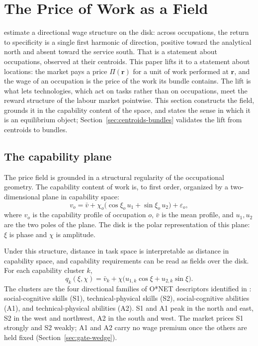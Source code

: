 \documentclass[12pt, a4paper]{article}
\begin{document}
\section{The Price of Work as a Field}
\label{sec:price-field}

\textcite{storck2026geometry} estimate a directional wage structure on
the disk: across occupations, the return to specificity is a single
first harmonic of direction, positive toward the analytical north and
absent toward the service south. That is a statement about
occupations, observed at their centroids. This paper lifts it to a
statement about locations: the market pays a price $\Pi(\mathbf{r})$
for a unit of work performed at $\mathbf{r}$, and the wage of an
occupation is the price of the work its bundle contains. The lift is
what lets technologies, which act on tasks rather than on occupations,
meet the reward structure of the labour market pointwise. This section
constructs the field, grounds it in the capability content of the
space, and states the sense in which it is an equilibrium object;
Section~\ref{sec:centroids-bundles} validates the lift from centroids
to bundles.

\subsection{The capability plane}
\label{sec:capability-plane}

The price field is grounded in a structural regularity of the
occupational geometry. The capability content of work is, to first
order, organized by a two-dimensional plane in capability space:
\begin{equation}
  v_o
  =
  \bar v
  +
  \chi_o
  \bigl(
    \cos\xi_o\,u_1
    +
    \sin\xi_o\,u_2
  \bigr)
  +
  \varepsilon_o,
  \label{eq:capability-plane}
\end{equation}
where $v_o$ is the capability profile of occupation $o$, $\bar v$ is
the mean profile, and $u_1,u_2$ are the two poles of the plane. The disk
is the polar representation of this plane: $\xi$ is phase and $\chi$ is
amplitude.

Under this structure, distance in task space is interpretable as
distance in capability space, and capability requirements can be read as
fields over the disk. For each capability cluster $k$,
\begin{equation}
  q_k(\xi,\chi)
  =
  \bar v_k
  +
  \chi
  \bigl(
    u_{1,k}\cos\xi
    +
    u_{2,k}\sin\xi
  \bigr).
  \label{eq:capability-field}
\end{equation}
The clusters are the four directional families of O*NET descriptors
identified in \textcite{storck2026geometry}: social-cognitive skills
(S1), technical-physical skills (S2), social-cognitive abilities (A1),
and technical-physical abilities (A2). S1 and A1 peak in the north and
east, S2 in the west and northwest, A2 in the south and west. The
market prices S1 strongly and S2 weakly; A1 and A2 carry no wage
premium once the others are held fixed
(Section~\ref{sec:gate-wedge}).
\end{document}
